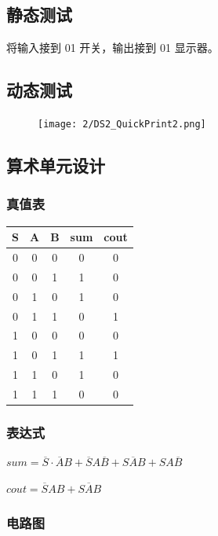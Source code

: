 \documentclass{article}
\begin{document}
\subsection{静态测试}

将输入接到 01 开关，输出接到 01 显示器。

\subsection{动态测试}

\begin{figure}[!hbp]
  \centering
  \texttt{[image: 2/DS2\_QuickPrint2.png]}
\end{figure}

\subsection{算术单元设计}

\subsubsection{真值表}

\begin{table}[!hbp]
\centering
\begin{tabular}{|c|c|c||c|c|}
\hline
S & A & B & sum & cout \\
\hline
0 & 0 & 0 & 0 & 0\\
\hline
0 & 0 & 1 & 1 & 0 \\
\hline
0 & 1 & 0 & 1 & 0\\
\hline
0 & 1 & 1 & 0 & 1 \\
\hline
1 & 0 & 0 & 0 & 0 \\
\hline
1 & 0 & 1 & 1 & 1\\
\hline
1 & 1 & 0 & 1 & 0 \\
\hline
1 & 1 & 1 & 0 & 0 \\
\hline

\end{tabular}
\end{table}

\subsubsection{表达式}

$sum = \overline{S} \cdot \overline{A}B + \overline{S}A \overline{B} + S \overline{A}B + SA \overline{B}$

$cout = \overline{S}AB + S \overline{A}B$

\subsubsection{电路图}
\end{document}
